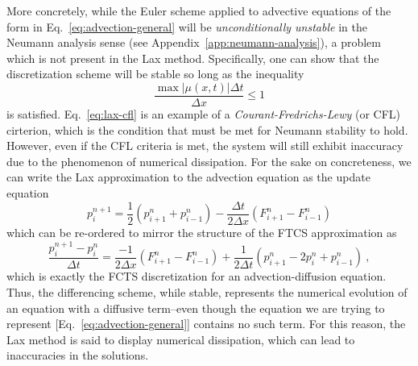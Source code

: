\documentclass[15pt]{article}
\begin{document}
More concretely, while the Euler scheme applied to advective equations of the form in Eq.~\eqref{eq:advection-general} will be \emph{unconditionally unstable} in the Neumann analysis sense (see Appendix~\ref{app:neumann-analysis}), a problem which is not present in the Lax method. Specifically, one can show that the discretization scheme will be stable so long as the inequality
\begin{equation}
    \frac{\max|\mu(x, t)|\Delta t}{\Delta x} \leq 1 \label{eq:lax-cfl}
\end{equation}
is satisfied. Eq.~\eqref{eq:lax-cfl} is an example of a \emph{Courant-Fredrichs-Lewy} (or CFL) cirterion, which is the condition that must be met for Neumann stability to hold.  However, even if the CFL criteria is met, the system will still exhibit inaccuracy due to the phenomenon of numerical dissipation. For the sake on concreteness, we can write the Lax approximation to the advection equation as the update equation
\begin{equation}
    p_i^{n+1} = \frac{1}{2}\left( p_{i+1}^n + p_{i-1}^n \right) - \frac{\Delta t}{2\Delta x}\left( F_{i+1}^n - F_{i-1}^n \right) \label{eq:lax-explicity}
\end{equation}
which can be re-ordered to mirror the structure of the FTCS approximation as
\begin{equation}
    \frac{p_{i}^{n+1} - p_{i}^{n}}{\Delta t} = \frac{-1}{2\Delta x}\left( F_{i+1}^n - F_{i-1}^n \right) + \frac{1}{2\Delta t}\left( p_{i+1}^n - 2p_i^n + p_{i-1}^n  \right) \ ,
\end{equation}
which is exactly the FCTS discretization for an advection-diffusion equation. Thus, the differencing scheme, while stable, represents the numerical evolution of an equation with a diffusive term--even though the equation we are trying to represent [Eq.~\eqref{eq:advection-general}] contains no such term. For this reason, the Lax method is said to display numerical dissipation, which can lead to inaccuracies in the solutions.
\end{document}
